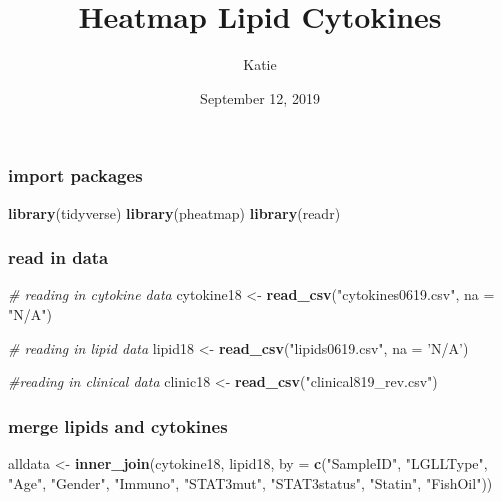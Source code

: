 \documentclass[]{article}
\title{Heatmap Lipid Cytokines}
\author{Katie}
\date{September 12, 2019}
\newenvironment{Shaded}{\begin{snugshade}}{\end{snugshade}}
\newcommand{\KeywordTok}[1]{\textcolor[rgb]{0.13,0.29,0.53}{\textbf{{#1}}}}
\newcommand{\DataTypeTok}[1]{\textcolor[rgb]{0.13,0.29,0.53}{{#1}}}
\newcommand{\StringTok}[1]{\textcolor[rgb]{0.31,0.60,0.02}{{#1}}}
\newcommand{\CommentTok}[1]{\textcolor[rgb]{0.56,0.35,0.01}{\textit{{#1}}}}
\newcommand{\NormalTok}[1]{{#1}}
\begin{document}
\maketitle

\subsubsection{import packages}\label{import-packages}

\begin{Shaded}
\begin{Highlighting}[]
\KeywordTok{library}\NormalTok{(tidyverse)}
\KeywordTok{library}\NormalTok{(pheatmap)}
\KeywordTok{library}\NormalTok{(readr)}
\end{Highlighting}
\end{Shaded}

\subsubsection{read in data}\label{read-in-data}

\begin{Shaded}
\begin{Highlighting}[]
\CommentTok{# reading in cytokine data}
\NormalTok{cytokine18 <-}\StringTok{ }\KeywordTok{read_csv}\NormalTok{(}\StringTok{"cytokines0619.csv"}\NormalTok{, }\DataTypeTok{na =} \StringTok{"N/A"}\NormalTok{)}

\CommentTok{# reading in lipid data}
\NormalTok{lipid18 <-}\StringTok{ }\KeywordTok{read_csv}\NormalTok{(}\StringTok{"lipids0619.csv"}\NormalTok{, }\DataTypeTok{na =} \StringTok{'N/A'}\NormalTok{)}

\CommentTok{#reading in clinical data}
\NormalTok{clinic18 <-}\StringTok{ }\KeywordTok{read_csv}\NormalTok{(}\StringTok{"clinical819_rev.csv"}\NormalTok{)}
\end{Highlighting}
\end{Shaded}

\subsubsection{merge lipids and
cytokines}\label{merge-lipids-and-cytokines}

\begin{Shaded}
\begin{Highlighting}[]
\NormalTok{alldata <-}\StringTok{ }\KeywordTok{inner_join}\NormalTok{(cytokine18, lipid18, }\DataTypeTok{by =} \KeywordTok{c}\NormalTok{(}\StringTok{"SampleID"}\NormalTok{, }\StringTok{"LGLLType"}\NormalTok{,  }\StringTok{"Age"}\NormalTok{, }\StringTok{"Gender"}\NormalTok{, }\StringTok{"Immuno"}\NormalTok{, }\StringTok{"STAT3mut"}\NormalTok{, }\StringTok{"STAT3status"}\NormalTok{, }\StringTok{"Statin"}\NormalTok{, }\StringTok{"FishOil"}\NormalTok{))}
\end{Highlighting}
\end{Shaded}
\end{document}
